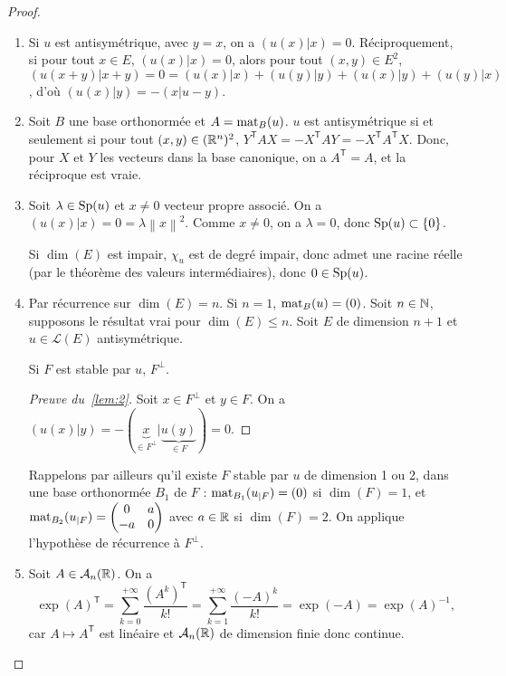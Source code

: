 \documentclass[12pt]{article}
\begin{document}
\begin{proof}
	\phantom{}
	\begin{enumerate}
		\item Si $u$ est antisymétrique, avec $y=x$, on a $(u(x)|x)=0$. Réciproquement, si pour tout $x\in E$, $(u(x)|x)=0$, alors pour tout $(x,y)\in E^{2}$, $(u(x+y)|x+y)=0=(u(x)|x)+(u(y)|y)+(u(x)|y)+(u(y)|x)$, d'où $(u(x)|y)=-(x|u-y)$.
		\item Soit $B$ une base orthonormée et $A=\operatorname{mat}_{B}(u)$. $u$ est antisymétrique si et seulement si pour tout $(x,y)\in(\mathbb{R}^{n})^{2}$, $Y^{\mathsf{T}}AX=-X^{\mathsf{T}}AY=-X^{\mathsf{T}}A^{\mathsf{T}}X$. Donc, pour $X$ et $Y$ les vecteurs dans la base canonique, on a $A^{\mathsf{T}}=A$, et la réciproque est vraie.
		\item Soit $\lambda\in\operatorname{Sp}(u)$ et $x\neq0$ vecteur propre associé. On a $(u(x)|x)=0=\lambda\left\lVert x\right\rVert^{2}$. Comme $x\neq0$, on a $\lambda=0$, donc $\operatorname{Sp}(u)\subset\left\lbrace0\right\rbrace$.
		
		Si $\dim(E)$ est impair, $\chi_{u}$ est de degré impair, donc admet une racine réelle (par le théorème des valeurs intermédiaires), donc $0\in\operatorname{Sp}(u)$.

		\item Par récurrence sur $\dim(E)=n$. Si $n=1$, $\operatorname{mat}_B(u)=(0)$. Soit $n\in\mathbb{N}$, supposons le résultat vrai pour $\dim(E)\leqslant n$. Soit $E$ de dimension $n+1$ et $u\in\mathcal{L}(E)$ antisymétrique.
		\begin{lemma}
			\label{lem:2}
			Si $F$ est stable par $u$, $F^{\perp}$.
		\end{lemma}
		\begin{proof}[Preuve du~\ref{lem:2}]
			Soit $x\in F^{\perp}$ et $y\in F$. On a $(u(x)|y)=-(\underbrace{x}_{\in F^{\perp}}|\underbrace{u(y)}_{\in F})=0$.
		\end{proof}

		Rappelons par ailleurs qu'il existe $F$ stable par $u$ de dimension 1 ou 2, dans une base orthonormée $B_1$ de $F$ : $\operatorname{mat}_{B_1}(u_{\mid F})=(0)$ si $\dim(F)=1$, et $\operatorname{mat}_{B_2}(u_{\mid F})=\begin{pmatrix}
			0&a\\ -a&0
		\end{pmatrix}$ avec $a\in\mathbb{R}$ si $\dim(F)=2$. On applique l'hypothèse de récurrence à $F^{\perp}$.

		\item Soit $A\in\mathcal{A}_n(\mathbb{R})$. On a 
		\begin{equation}
			\exp(A)^{\mathsf{T}}=\sum_{k=0}^{+\infty}\frac{\left(A^{k}\right)^{\mathsf{T}}}{k!}=\sum_{k=1}^{+\infty}\frac{(-A)^{k}}{k!}=\exp(-A)=\exp(A)^{-1},
		\end{equation}
		car $A\mapsto A^{\mathsf{T}}$ est linéaire et $\mathcal{A}_n(\mathbb{R})$ de dimension finie donc continue.


\end{enumerate}
\end{proof}
\end{document}
